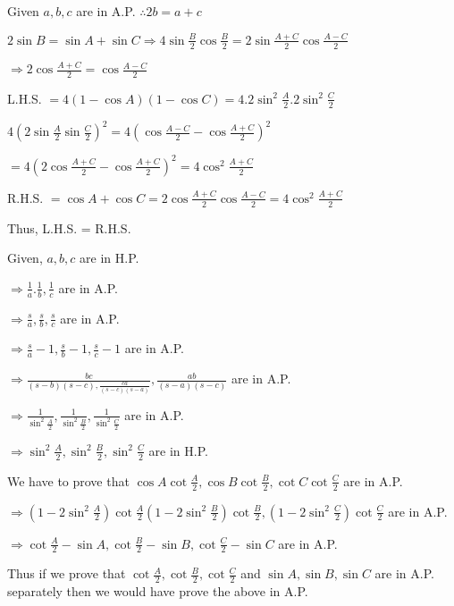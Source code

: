 \item Given $a,b,c$ are in A.P. $\therefore 2b = a + c$

  $2\sin B = \sin A + \sin C \Rightarrow 4\sin\frac{B}{2}\cos\frac{B}{2} = 2\sin\frac{A + C}{2}\cos\frac{A - C}{2}$

  $\Rightarrow 2\cos\frac{A + C}{2} = \cos\frac{A - C}{2}$

  L.H.S. $= 4(1 - \cos A)(1 - \cos C) = 4.2\sin^2\frac{A}{2}.2\sin^2\frac{C}{2}$

  $4\left(2\sin\frac{A}{2}\sin\frac{C}{2}\right)^2 = 4\left(\cos\frac{A - C}{2} - \cos\frac{A + C}{2}\right)^2$

  $= 4\left(2\cos\frac{A + C}{2} - \cos\frac{A + C}{2}\right)^2 = 4\cos^2\frac{A + C}{2}$

  R.H.S. $= \cos A + \cos C = 2\cos\frac{A + C}{2}\cos\frac{A - C}{2} = 4\cos^2\frac{A + C}{2}$

  Thus, L.H.S. = R.H.S.

\item Given, $a, b, c$ are in H.P.

  $\Rightarrow \frac{1}{a}. \frac{1}{b}, \frac{1}{c}$ are in A.P.

  $\Rightarrow \frac{s}{a}, \frac{s}{b}, \frac{s}{c}$ are in A.P.

  $\Rightarrow \frac{s}{a} -1, \frac{s}{b} - 1, \frac{s}{c} - 1$ are in A.P.

  $\Rightarrow \frac{bc}{(s - b)(s - c), \frac{ca}{(s - c)(s - a)}}, \frac{ab}{(s - a)(s - c)}$ are in A.P.

  $\Rightarrow \frac{1}{\sin^2\frac{A}{2}}, \frac{1}{\sin^2\frac{B}{2}}, \frac{1}{\sin^2\frac{C}{2}}$ are in A.P.

  $\Rightarrow \sin^2\frac{A}{2}, \sin^2\frac{B}{2}, \sin^2\frac{C}{2}$ are in H.P.

\item We have to prove that $\cos A\cot\frac{A}{2}, \cos B\cot\frac{B}{2}, \cot C\cot\frac{C}{2}$ are in A.P.

  $\Rightarrow \left(1 - 2\sin^2\frac{A}{2}\right)\cot\frac{A}{2} \left(1 - 2\sin^2\frac{B}{2}\right)\cot\frac{B}{2},
  \left(1 - 2\sin^2\frac{C}{2}\right)\cot\frac{C}{2}$ are in A.P.

  $\Rightarrow \cot\frac{A}{2} - \sin A, \cot\frac{B}{2} - \sin B, \cot\frac{C}{2} - \sin C$ are in A.P.

  Thus if we prove that $\cot \frac{A}{2}, \cot \frac{B}{2}, \cot \frac{C}{2}$ and $\sin A, \sin B, \sin C$ are in
  A.P. separately then we would have prove the above in A.P.

